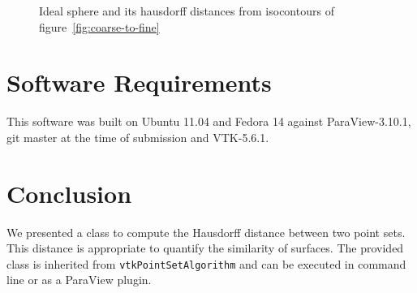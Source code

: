 \documentclass{InsightArticle}
\begin{document}
%
\begin{figure}
 \centering
 \caption{Ideal sphere and its hausdorff distances from isocontours of figure~\ref{fig:coarse-to-fine}}
 \label{fig:hausdorff}
\end{figure}

%
\section{Software Requirements}
%
This software was built on Ubuntu 11.04 and Fedora 14 against ParaView-3.10.1, git master at the time of submission and VTK-5.6.1.
%
\section{Conclusion}
We presented a class to compute the Hausdorff distance between two point sets. This distance is appropriate to quantify the similarity of surfaces. The provided class is inherited from \verb!vtkPointSetAlgorithm! and can be executed in command line or as a ParaView plugin.
%
%
\appendix
%
%
%
%


%
\end{document}

